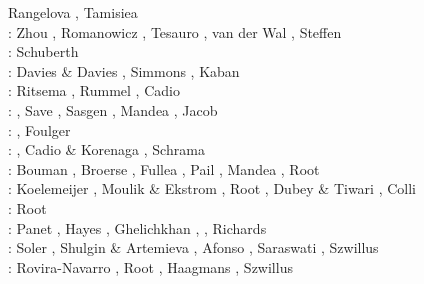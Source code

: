 \begin{scriptsize}
                   Rangelova \etal \cite{ravb07}, Tamisiea \etal \cite{tamd07}\\
\twothousandeight: Zhou \cite{zhou08}, Romanowicz \cite{roma08}, 
                   Tesauro \etal \cite{tekc08}, van der Wal \cite{vaws08}, 
                   Steffen \etal \cite{stdm08}\\
\twothousandnine: Schuberth \etal \cite{scbr09}\\
\twothousandten: Davies \& Davies \cite{dada10}, Simmons \etal \cite{sifb10}, Kaban \etal \cite{katc10}\\
\twothousandeleven: Ritsema \etal \cite{ridv11}, Rummel \etal \cite{ruys11}, Cadio \etal \cite{capd11}\\
\twothousandtwelve: \cite{hawj12}\cite{resa12}\cite{hawj12}
                    \cite{fesw12}\cite{simj12}\cite{beck12}\cite{pahk12}, 
                    Save \etal \cite{sabt12}, Sasgen \etal \cite{sakm12}, 
                    Mandea \etal \cite{mapl12}, Jacob \etal \cite{jawp12}\\
\twothousandthirteen: \cite{ress13}\cite{ebbf13}\cite{davi13}\cite{scle13}\cite{waja13}, 
                      Foulger \etal \cite{fopa13}\\
\twothousandfourteen: \cite{paml14}\cite{ebbf14}\cite{krbk14}\cite{licl14}\cite{aubb14}, 
                      Cadio \& Korenaga \cite{cako14}, Schrama \etal \cite{scwr14}\\
\twothousandfifteen: Bouman \etal \cite{boem15}, Broerse \etal \cite{brrs15}, 
                     Fullea \etal \cite{furc15}, Pail \etal \cite{pabb15},
                     Mandea \etal \cite{manp15}, Root \etal \cite{rotv15}\\
\twothousandsixteen: Koelemeijer \etal \cite{kord16}, Moulik \& Ekstrom \cite{moek16}, 
                     Root \etal \cite{rond16}, 
                     Dubey \& Tiwari \cite{duti16}, Colli \etal \cite{cogb16}\\
\twothousandseventeen: Root \etal \cite{roev17}\\
\twothousandeighteen: Panet \etal \cite{pabn18}, Hayes \etal \cite{hamp18}, 
                      Ghelichkhan \etal \cite{ghmc18}, \cite{homs18}, 
                      Richards \etal \cite{rihc18}\\
\twothousandnineteen: Soler \etal \cite{sopg19}, Shulgin \& Artemieva \cite{shar19}, 
                      Afonso \etal \cite{afss19}, 
                      Saraswati \cite{sacm19}, Szwillus \etal \cite{szae19}\\
\twothousandtwenty: Rovira-Navarro \etal \cite{rovb20}, Root \cite{root20}, 
                    Haagmans \etal \cite{hasm20}, Szwillus \etal \cite{szes20}
\end{scriptsize}

